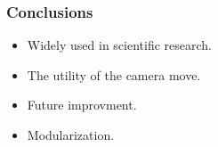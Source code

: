 \begin{frame}
    \frametitle{Conclusions}
    \begin{itemize}
        \item Widely used in scientific research.
        \item The utility of the camera move.
        \item Future improvment.
        \item Modularization.
    \end{itemize}
\end{frame}
